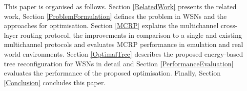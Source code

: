 This paper is organised as follows. Section \ref{RelatedWork} presents the related work, Section \ref{ProblemFormulation} defines the problem in WSNs and the approaches for optimisation. Section \ref{MCRP} explains the multichannel cross-layer routing protocol, the improvements in comparison to a single and existing multichannel protocols and evaluates MCRP performance in emulation and real world environments.
Section \ref{OptimalTree} describes the proposed energy-based tree reconfiguration for WSNs in detail and Section \ref{PerformanceEvaluation} evaluates the performance of the proposed optimisation. Finally, Section \ref{Conclusion} concludes this paper.